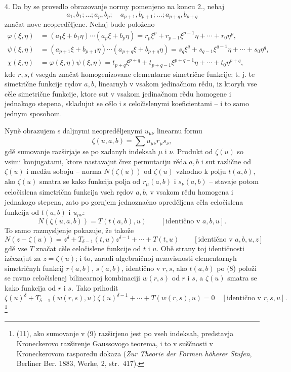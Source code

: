 \documentclass[11pt]{article}
\begin{document}
4. Da by se provedlo obrazovanje normy pomenjeno na koncu 2., nehaj
\[
 a_1,b_1;\ldots; a_p,b_p;\quad a_{p+1},b_{p+1};\ldots; a_{p+q},b_{p+q}
\]
značat nove neopreděljene. Nehaj bude položeno
\begin{equation}
\begin{aligned}
 \varphi(\xi,\eta)&=(a_1\xi+b_1\eta)\cdots(a_p\xi+b_p\eta)
     =r_p\xi^p+r_{p-1}\xi^{p-1}\eta+\cdots+r_0\eta^p,\\
 \psi(\xi,\eta)&=(a_{p+1}\xi+b_{p+1}\eta)\cdots(a_{p+q}\xi+b_{p+q}\eta)
     =s_q\xi^q+s_{q-1}\xi^{q-1}\eta+\cdots+s_0\eta^q,\\
 \chi(\xi,\eta)&=\varphi(\xi,\eta)\psi(\xi,\eta)
     =t_{p+q}\xi^{p+q}+t_{p+q-1}\xi^{p+q-1}\eta+\cdots+t_0\eta^{p+q},
\end{aligned}
\tag{8}
\end{equation}
kde $r,s,t$ vsegda značat homogenizovane elementarne simetrične funkcije; t. j. te simetrične funkcije rędov $a,b$, linearnyh v vsakom jedinačnom rědu, iz ktoryh vse cěle simetrične funkcije, ktore sut v vsakom jedinačnom rědu homogene i jednakogo stepena, skladujut se cělo i s celočislenymi koeficientami -- i to samo jednym sposobom.

Nyně obrazujem s daljnymi neopreděljenymi $u_{\mu\nu}$ linearnu formu
\begin{equation}
 \zeta(u,a,b)=\sum u_{\mu\nu}r_\mu s_\nu,
\tag{9}
\end{equation}
gdě sumovanje razširjaje se po zadanyh indeksah $\mu$ i $\nu$. Produkt od $\zeta(u)$ so vsimi konjugatami, ktore nastavajut črez permutaciju rěda $a,b$ i sut različne od $\zeta(u)$ i medžu soboju -- norma $N(\zeta(u))$ od $\zeta(u)$ vzhodno k polju $t(a,b)$, ako $\zeta(u)$ smatra se kako funkcija polja od $r_\mu(a,b)$ i $s_\nu(a,b)$ -- stavaje potom celočislena simetrična funkcija vseh rędov $a,b$, v vsakom rědu homogena i jednakogo stepena, zato po gornjem jednoznačno opreděljena cěla celočislena funkcija od $t(a,b)$ i $u_{\mu\nu}$:
\begin{equation}
 N(\zeta(u,a,b))=T(t(a,b),u)\qquad[\text{identično v }a,b,u].
\tag{10}
\end{equation}
To samo razmysljenje pokazuje, že takože
\[
N(z-\zeta(u))=z^\delta+T_{\delta-1}(t,u)z^{\delta-1}+\cdots+T(t,u)
\qquad[\text{identično v }a,b,u,z]
\]
gdě vse $T$ značat cěle celočislene funkcije od $t$ i $u$. Obě strany toj identičnosti izčezajut za $z=\zeta(u)$; i to, zaradi algebraičnoj nezavisnosti elementarnyh simetričnyh funkcij $r(a,b)$, $s(a,b)$, identično v $r,s$, ako $t(a,b)$ po (8) položi se ravno celočislenej bilinearnoj kombinaciji $w(r,s)$ od $r$ i $s$, a $\zeta(u)$ smatra se kako funkcija od $r$ i $s$. Tako prihodit
\begin{equation}
\zeta(u)^\delta+T_{\delta-1}(w(r,s),u)\zeta(u)^{\delta-1}+\cdots+T(w(r,s),u)=0
\quad[\text{identično v }r,s,u].
\tag{11}
\end{equation}\footnote{(11), ako sumovanje v (9) razširjeno jest po vseh indeksah, predstavja Kroneckerovo razširenje Gaussovogo teorema, i to v suščnosti v Kroneckerovom rasporedu dokaza (\emph{Zur Theorie der Formen höherer Stufen}, Berliner Ber. 1883, Werke, 2, str.~417).}
\end{document}
